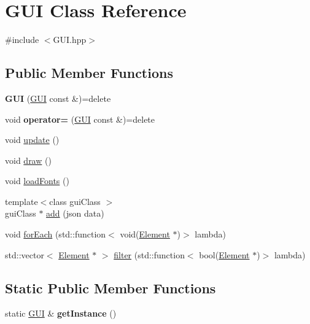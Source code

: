 \hypertarget{class_g_u_i}{}\section{G\+UI Class Reference}
\label{class_g_u_i}


{\ttfamily \#include $<$G\+U\+I.\+hpp$>$}

\subsection*{Public Member Functions}
\begin{DoxyCompactItemize}
\item 
\mbox{\label{class_g_u_i_a6db237f72160f7a275edd77dd174509a}} 
{\bfseries G\+UI} (\hyperlink{class_g_u_i}{G\+UI} const \&)=delete
\item 
\mbox{\label{class_g_u_i_a9453ec273926fae8efb75a21e182880c}} 
void {\bfseries operator=} (\hyperlink{class_g_u_i}{G\+UI} const \&)=delete
\item 
void \hyperlink{class_g_u_i_a947e568bf884a8798e3e368417f662c7}{update} ()
\item 
void \hyperlink{class_g_u_i_a9dace388dbf579b96d875f4a051d1174}{draw} ()
\item 
void \hyperlink{class_g_u_i_acb6e7edb5e1b2046f64fabb9dc7f59d1}{load\+Fonts} ()
\item 
{\footnotesize template$<$class gui\+Class $>$ }\\gui\+Class $\ast$ \hyperlink{class_g_u_i_a9876e8096b1eb321dd8ef4bc54a457fb}{add} (json data)
\item 
void \hyperlink{class_g_u_i_a5789f941b0b94492dcae57911f5a820d}{for\+Each} (std\+::function$<$ void(\hyperlink{class_element}{Element} $\ast$)$>$ lambda)
\item 
std\+::vector$<$ \hyperlink{class_element}{Element} $\ast$ $>$ \hyperlink{class_g_u_i_a5c2ac00b75ff32fe22396e61c6ef9edd}{filter} (std\+::function$<$ bool(\hyperlink{class_element}{Element} $\ast$)$>$ lambda)
\end{DoxyCompactItemize}
\subsection*{Static Public Member Functions}
\begin{DoxyCompactItemize}
\item 
\mbox{\label{class_g_u_i_a78ab376fe2c917e5dc0199f634d963d8}} 
static \hyperlink{class_g_u_i}{G\+UI} \& {\bfseries get\+Instance} ()
\end{DoxyCompactItemize}
